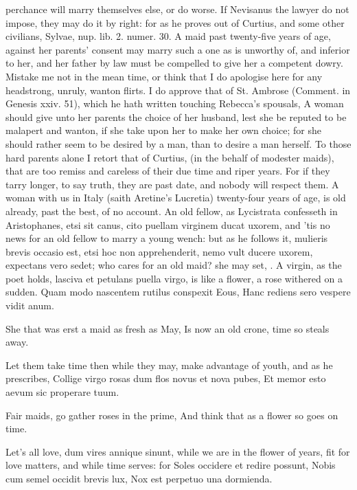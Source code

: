 {perchance will marry themselves else, or do worse. If Nevisanus the
lawyer do not impose, they may do it by right: for as he proves out of
Curtius, and some other civilians, Sylvae, nup. lib. 2. numer. 30.
A maid past twenty-five years of age, against her parents'
consent may marry such a one as is unworthy of, and inferior to her,
and her father by law must be compelled to give her a competent dowry.
Mistake me not in the mean time, or think that I do apologise here for
any headstrong, unruly, wanton flirts. I do approve that of St. Ambrose
(Comment. in Genesis xxiv. 51), which he hath written touching
Rebecca's spousals, A woman should give unto her parents the choice of
her husband, lest she be reputed to be malapert and wanton, if
she take upon her to make her own choice; for she should rather
seem to be desired by a man, than to desire a man herself. To those
hard parents alone I retort that of Curtius, (in the behalf of modester
maids), that are too remiss and careless of their due time and riper
years. For if they tarry longer, to say truth, they are past date, and
nobody will respect them. A woman with us in Italy (saith
Aretine's Lucretia) twenty-four years of age, is old already,
past the best, of no account. An old fellow, as Lycistrata confesseth
in Aristophanes, etsi sit canus, cito puellam virginem ducat
uxorem, and 'tis no news for an old fellow to marry a young wench: but
as he follows it, mulieris brevis occasio est, etsi hoc non
apprehenderit, nemo vult ducere uxorem, expectans vero sedet; who cares
for an old maid? she may set, \etc{}. A virgin, as the poet holds, lasciva
et petulans puella virgo, is like a flower, a rose withered on a
sudden.
Quam modo nascentem rutilus conspexit Eous,
Hanc rediens sero vespere vidit anum.

She that was erst a maid as fresh as May,
Is now an old crone, time so steals away.

Let them take time then while they may, make advantage of youth, and as
he prescribes,
Collige virgo rosas dum flos novus et nova pubes,
Et memor esto aevum sic properare tuum.

Fair maids, go gather roses in the prime,
And think that as a flower so goes on time.

Let's all love, dum vires annique sinunt, while we are in the flower of
years, fit for love matters, and while time serves: for
Soles occidere et redire possunt,
Nobis cum semel occidit brevis lux,
Nox est perpetuo una dormienda.

}
